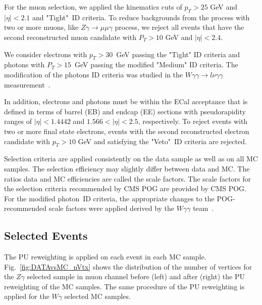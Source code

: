 For the muon selection, we applied the kinematics cuts of $p_T>25$ GeV and $|\eta|<2.1$ and "Tight"~ID criteria. To reduce backgrounds from the process with two or more muons, like $Z\gamma\rightarrow\mu\mu\gamma$ process, we reject all events that have the second reconstructed muon candidate with $P_T>10$ GeV and $|\eta|<2.4$. 

We consider electrons with $p_T>30$~GeV passing the "Tight" ID criteria and photons with $P_T>15$~GeV passing the modified "Medium" ID criteria. The modification of the photons ID criteria was studied in the $W\gamma\gamma \rightarrow l\nu\gamma\gamma$ measurement~\cite{ref_Wgg8TeV}. 

In addition, electrons and photons must be within the ECal acceptance that is defined in terms of barrel (EB) and endcap (EE) sections with pseudorapidity ranges of $|\eta| < 1.4442$ and $1.566 < |\eta| < 2.5$, respectively. To reject events with two or more final state electrons, events with the second reconstructed electron candidate with $p_T>10$ GeV and satisfying the "Veto"~ID criteria are rejected. %

Selection criteria are applied consistently on the data sample as well as on all MC samples. The selection efficiency may slightly differ between data and MC. The ratios data and MC efficiencies are called the scale factors. The scale factors for the selection criteria recommended by CMS POG are provided by CMS POG. For the modified photon~ID criteria, the appropriate changes to the POG-recommended scale factors were applied derived by the $W\gamma\gamma$ team~\cite{ref_Wgg8TeV}.



\subsection{Selected Events}


The PU reweighting is applied on each event in each MC sample. Fig.~\ref{fig:DATAvsMC_nVtx} shows the distribution of the number of vertices for the $Z\gamma$ selected sample in muon channel before (left) and after (right) the PU reweighting of the MC samples. The same procedure of the PU reweighting is applied for the $W\gamma$ selected MC samples.

